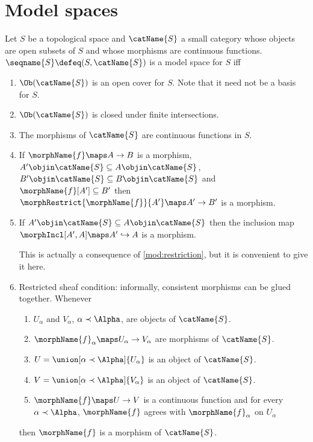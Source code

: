 \documentclass{article}
\begin{document}
\section{Model spaces}
\begin{definition}
\label{def:model}
Let $S$ be a topological space and $\catName{S}$ a small category whose
objects are open subsets of $S$ and whose morphisms are continuous
functions. $\seqname{S} \defeq (S, \catName{S})$ is a model space for
$S$ iff

\begin{enumerate}
\item $\Ob(\catName{S})$ is an open cover for $S$. Note that it need
not be a basis for $S$.
\label{mod:cover}
\item $\Ob(\catName{S})$ is closed under finite intersections.
\label{mod:closed}
\item The morphisms of $\catName{S}$ are continuous functions in $S$.
\label{mod:continuous}
\item If $\morphName{f} \maps A \to B$ is a morphism,
$A' \objin \catName{S} \subseteq A \objin \catName{S}$,
$B' \objin \catName{S} \subseteq B \objin \catName{S}$ and
\nobreaks
{{
  $\morphName{f}[A'] \subseteq B'$
}}
then
$\morphRestrict{\morphName{f}}{A'} \maps A' \to B'$ is a morphism.
\label{mod:restriction}
\item If $A' \objin \catName{S} \subseteq A \objin \catName{S}$ then
the inclusion map $\morphIncl[{A'},{A}] \maps A' \hookrightarrow A$ is a
morphism.
\label{mod:inclusion}
\begin{remark}
This is actually a consequence of \cref{mod:restriction},
but it is convenient to give it here.
\end{remark}
\item Restricted sheaf condition:
\label{mod:sheaf}
informally, consistent morphisms can be glued together. Whenever
\begin{enumerate}
\item $U_\alpha$ and $V_\alpha$, $\alpha \prec \Alpha$,
are objects of $\catName{S}$.
\item $\morphName{f}_\alpha \maps U_\alpha \to V_\alpha$ are morphisms of
$\catName{S}$.
\item
$U = \union[\alpha \prec \Alpha]{U_\alpha}$ is an object of $\catName{S}$.
\item
$V = \union[\alpha \prec \Alpha]{V_\alpha}$ is an object of $\catName{S}$.
\item
$\morphName{f} \maps U \to V$ is a continuous function and
for every $\alpha \prec \Alpha$,
$\morphName{f}$ agrees with $\morphName{f}_\alpha$ on $U_\alpha$
\end{enumerate}
then $\morphName{f}$ is a morphism of $\catName{S}$.
\end{enumerate}


\end{definition}
\end{document}
